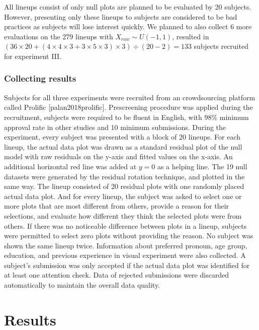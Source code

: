 \documentclass[]{interact}
\theoremstyle{plain}%
\theoremstyle{definition}
\theoremstyle{remark}
\begin{document}
All lineups consist of only null plots are planned to be evaluated by 20
subjects. However, presenting only these lineups to subjects are
considered to be bad practices as subjects will lose interest quickly.
We planned to also collect 6 more evaluations on the 279 lineups with
\(X_{raw} \sim U(-1,1)\), resulted in
\((36 \times 20 + (4 \times 4 \times 3 + 3 \times 5 \times 3) \times 3) \div (20-2) = 133\)
subjects recruited for experiment III.

\hypertarget{collecting-results}{%
\subsubsection{Collecting results}\label{collecting-results}}

Subjects for all three experiments were recruited from an crowdsourcing
platform called Prolific {[}palan2018prolific{]}. Prescreening procedure
was applied during the recruitment, subjects were required to be fluent
in English, with \(98\%\) minimum approval rate in other studies and 10
minimum submissions. During the experiment, every subject was presented
with a block of 20 lineups. For each lineup, the actual data plot was
drawn as a standard residual plot of the null model with raw residuals
on the y-axis and fitted values on the x-axis. An additional horizontal
red line was added at \(y = 0\) as a helping line. The 19 null datasets
were generated by the residual rotation technique, and plotted in the
same way. The lineup consisted of 20 residual plots with one randomly
placed actual data plot. And for every lineup, the subject was asked to
select one or more plots that are most different from others, provide a
reason for their selections, and evaluate how different they think the
selected plots were from others. If there was no noticeable difference
between plots in a lineup, subjects were permitted to select zero plots
without providing the reason. No subject was shown the same lineup
twice. Information about preferred pronoun, age group, education, and
previous experience in visual experiment were also collected. A
subject's submission was only accepted if the actual data plot was
identified for at least one attention check. Data of rejected
submissions were discarded automatically to maintain the overall data
quality.

\hypertarget{results}{%
\section{Results}\label{results}}
\end{document}
